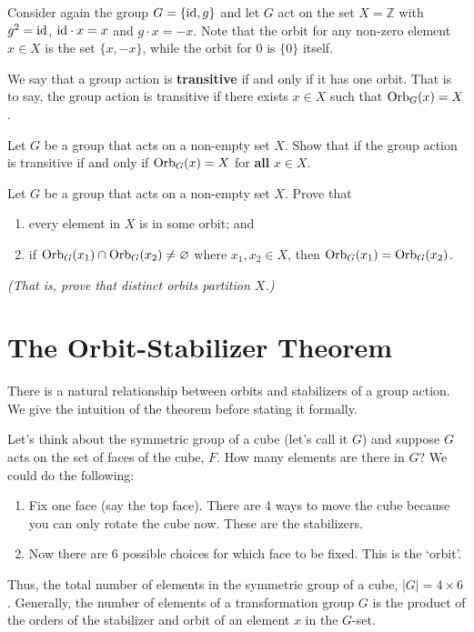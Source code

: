\begin{example}
    Consider again the group $G = \{\mathrm{id}, g\}$ and let $G$ act on the set $X = \mathbb{Z}$ with $g^2 = \mathrm{id}$, $\mathrm{id} \cdot x = x$ and $g \cdot x = -x$. Note that the orbit for any non-zero element $x \in X$ is the set $\{x, -x\}$, while the orbit for 0 is $\{0\}$ itself.
\end{example}

We say that a group action is \textbf{transitive} if and only if it has one orbit. That is to say, the group action is transitive if there exists $x \in X$ such that $\mathrm{Orb}_{G}(x) = X$.

\begin{exercise}
    Let $G$ be a group that acts on a non-empty set $X$. Show that if the group action is transitive if and only if $\mathrm{Orb}_{G}(x) = X$ for \textbf{all} $x \in X$.
\end{exercise}

\begin{exercise}\label{exercise-distinct-orbits-partition-set}
    Let $G$ be a group that acts on a non-empty set $X$. Prove that
    \begin{enumerate}[label=(\alph*)]
        \item every element in $X$ is in some orbit; and
        \item if $\mathrm{Orb}_{G}(x_1) \cap \mathrm{Orb}_{G}(x_2) \neq \varnothing$ where $x_1, x_2 \in X$, then $\mathrm{Orb}_{G}(x_1) = \mathrm{Orb}_{G}(x_2)$.
    \end{enumerate}
    \textit{(That is, prove that distinct orbits partition $X$.)}
\end{exercise}

\section{The Orbit-Stabilizer Theorem}
There is a natural relationship between orbits and stabilizers of a group action. We give the intuition of the theorem before stating it formally.

Let's think about the symmetric group of a cube (let's call it $G$) and suppose $G$ acts on the set of faces of the cube, $F$. How many elements are there in $G$? We could do the following:
\begin{enumerate}
    \item Fix one face (say the top face). There are 4 ways to move the cube because you can only rotate the cube now. These are the stabilizers.
    \item Now there are 6 possible choices for which face to be fixed. This is the `orbit'.
\end{enumerate}
Thus, the total number of elements in the symmetric group of a cube, $|G| = 4 \times 6$. Generally, the number of elements of a transformation group $G$ is the product of the orders of the stabilizer and orbit of an element $x$ in the $G$-set.

